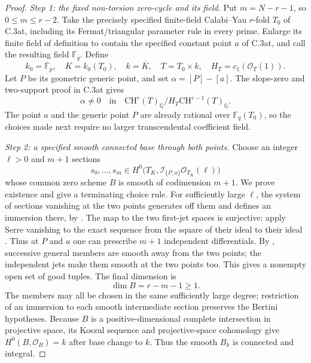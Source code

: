 \begin{proof}
\emph{Step 1: the fixed non-torsion zero-cycle and its field.}
Put $m=N-r-1$, so $0\le m\le r-2$. Take the precisely specified
finite-field Calabi--Yau $r$-fold $T_0$ of C.3at, including its
Fermat/triangular parameter rule in every prime. Enlarge its finite
field of definition to contain the specified constant point $a$ of
C.3at, and call the resulting field $\mathbb F_q$. Define
\[
 k_0=\overline{\mathbb F}_p,
 \quad K=k_0(T_0),
 \quad k=\overline K,
 \quad T=T_0\times k,
 \quad H_T=c_1(\mathcal O_T(1)).
\]
Let $P$ be its geometric generic point, and set $\alpha=[P]-[a]$.
The slope-zero and two-support proof in C.3at gives
\begin{equation}\label{eq:C3aw-nonsupport}
 \alpha\ne0\quad\text{in}\quad
 \mathrm{CH}^r(T)_{\mathbb Q}/
                    H_T\mathrm{CH}^{r-1}(T)_{\mathbb Q}.
\end{equation}
The point $a$ and the generic point $P$ are already rational over
$\mathbb F_q(T_0)$, so the choices made next require no larger
transcendental coefficient field.

\emph{Step 2: a specified smooth connected base through both points.}
Choose an integer $\ell>0$ and $m+1$ sections
\[
 s_0,\ldots,s_m\in
 H^0\bigl(T_{K},\mathcal I_{\{P,a\}}\mathcal O_{T_K}(\ell)\bigr)
\]
whose common zero scheme $B$ is smooth of codimension $m+1$.
We prove existence and give a terminating choice rule.
For sufficiently large $\ell$, the system of sections vanishing at
the two points generates off them and defines an immersion there,
by \citet[Lemma 33.47.1]{D_StacksBertini0FD4}. The map to the two
first-jet spaces is surjective: apply Serre vanishing to the exact
sequence from the square of their ideal to their ideal
\citep[Lemma 30.17.1, Tag 0B5U]{D_StacksSerre0B5U}. Thus at
$P$ and $a$ one can prescribe $m+1$ independent differentials.
By \citet[Lemma 33.47.3 and its proof]{D_StacksBertini0FD4},
successive general members are smooth away from the two points;
the independent jets make them smooth at the two points too.
This gives a nonempty open set of good tuples. The final dimension is
\[
                            \dim B=r-m-1\ge1.
\]
The members may all be chosen in the same sufficiently large degree;
restriction of an immersion to each smooth intermediate section
preserves the Bertini hypotheses. Because $B$ is a positive-dimensional
complete intersection in projective space, its Koszul sequence and
projective-space cohomology give $H^0(B,\mathcal O_B)=k$ after base
change to $k$. Thus the smooth $B_k$ is connected and integral.


\end{proof}
